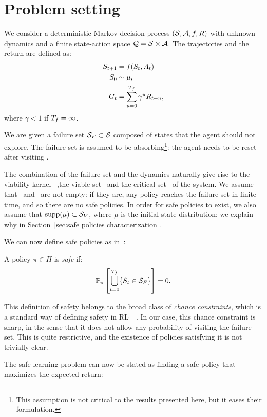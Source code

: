 \section{Problem setting} \label{sec:setting}
We consider a deterministic Markov decision process $(\mathcal{S}, \mathcal{A}, f, R)$ with unknown dynamics and a finite state-action space $\mathcal{Q} = \mathcal{S}\times\mathcal{A}$. The trajectories and the return are defined as:
\begin{align}
	S_{t+1} & = f(S_t, A_t)\\
	S_0 & \sim \mu,\\
	G_t & = \sum_{u = 0}^{{T_f}} \gamma^uR_{t+u},
\end{align}
where $\gamma < 1$ if ${T_f} = \infty$.\par
We are given a failure set ${\mathcal{S}_{F}}\subset\mathcal{S}$ composed of states that the agent should not explore. The failure set is assumed to be absorbing\footnote{This assumption is not critical to the results presented here, but it eases their formulation.}: the agent needs to be reset after visiting \SF.\par
The combination of the failure set and the dynamics naturally give rise to the viability kernel \SV~,the viable set \QV~and the critical set \QC~of the system. We assume that \SV~and \QV~are not empty: if they are, any policy reaches the failure set in finite time, and so there are no safe policies. In order for safe policies to exist, we also assume that $\operatorname{supp}(\mu) \subset {\ensuremath{\mathcal{S}}_{V}}$, where $\mu$ is the initial state distribution: we explain why in Section~\ref{sec:safe policies characterization}.\par
We can now define safe policies as in~\cite{heim2020learnable}:
\begin{definition}
	A policy $\pi \in \Pi$ is\emph{ safe} if:
	\begin{equation}
		\mathbb{P}_\pi\left[\bigcup_{t=0}^{{T_f}}\{S_t\in{\ensuremath{\mathcal{S}}_{F}}\}\right] = 0. \label{eq:safety def}
	\end{equation}
\end{definition}
This definition of safety belongs to the broad class of\emph{ chance constraints}, which is a standard way of defining safety in RL~\cite{geibel2005risk}~\cite{paternain2019safe}. In our case, this chance constraint is sharp, in the sense that it does not allow any probability of visiting the failure set. This is quite restrictive, and the existence of policies satisfying it is not trivially clear.\par
The safe learning problem can now be stated as finding a safe policy that maximizes the expected return:
